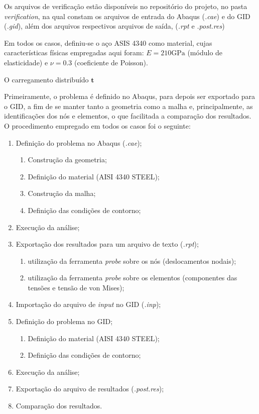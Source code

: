 Os arquivos de verificação estão disponíveis no repositório do projeto, no pasta \emph{verification}, na qual constam os arquivos de entrada do Abaqus (\emph{.cae}) e do GID (\emph{.gid}), além dos arquivos respectivos arquivos de saída, (\emph{.rpt} e \emph{.post.res})

Em todos os casos, definiu-se o aço ASIS 4340 como material, cujas características físicas empregadas aqui foram: $E = 210 \text{GPa}$ (módulo de elasticidade) e $\nu = 0.3$ (coeficiente de Poisson).

O carregamento distribuído $\bm{t}$

Primeiramente, o problema é definido no Abaqus, para depois ser exportado para o GID, a fim de se manter tanto a geometria como a malha e, principalmente, as identificações dos nós e elementos, o que facilitada a comparação dos resultados. O procedimento empregado em todos os casos foi o seguinte:

\begin{enumerate}
    \item Definição do problema no Abaqus (\emph{.cae});
    \begin{enumerate}
        \item Construção da geometria;
        \item Definição do material (AISI 4340 STEEL);
        \item Construção da malha;
        \item Definição das condições de contorno;
    \end{enumerate} 
    \item Execução da análise;
    \item Exportação dos resultados para um arquivo de texto (\emph{.rpt});
    \begin{enumerate}
        \item utilização da ferramenta \emph{probe} sobre os nós (deslocamentos nodais);
        \item utilização da ferramenta \emph{probe} sobre os elementos (componentes das tensões e tensão de von Mises);
    \end{enumerate}
    \item Importação do arquivo de \emph{input} no GID (\emph{.inp});
    \item Definição do problema no GID;
    \begin{enumerate}
        \item Definição do material (AISI 4340 STEEL);
        \item Definição das condições de contorno;
    \end{enumerate}
    \item Execução da análise;
    \item Exportação do arquivo de resultados (\emph{.post.res});
    \item Comparação dos resultados.
\end{enumerate}

